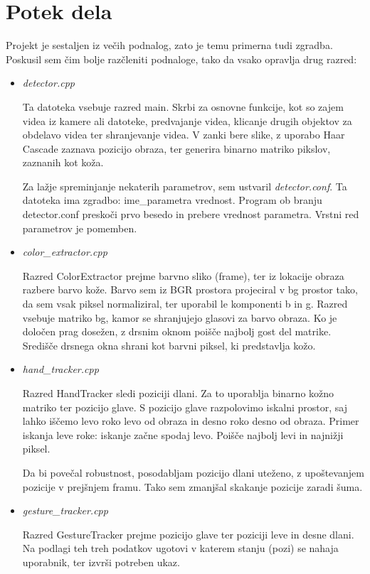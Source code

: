 \documentclass[a4paper, 12pt]{article}
\begin{document}
\section{Potek dela}
Projekt je sestaljen iz večih podnalog, zato je temu primerna tudi zgradba. Poskusil sem čim bolje razčleniti podnaloge, tako da vsako opravlja drug razred:
\begin{itemize}
\item \emph{detector.cpp}

Ta datoteka vsebuje razred main. Skrbi za osnovne funkcije, kot so zajem videa iz kamere ali datoteke, predvajanje videa, klicanje drugih objektov za obdelavo videa ter shranjevanje videa.
V zanki bere slike, z uporabo Haar Cascade zaznava pozicijo obraza, ter generira binarno matriko pikslov, zaznanih kot koža.

Za lažje spreminjanje nekaterih parametrov, sem ustvaril \emph{detector.conf}. Ta datoteka ima zgradbo: ime\_parametra vrednost. Program ob branju detector.conf preskoči prvo besedo in prebere vrednost parametra. Vrstni red parametrov je pomemben.

\item \emph{color\_extractor.cpp}

Razred ColorExtractor prejme barvno sliko (frame), ter iz lokacije obraza razbere barvo kože.	Barvo sem iz BGR prostora projeciral v bg prostor tako, da sem vsak piksel normaliziral, ter uporabil le komponenti b in g. Razred vsebuje matriko bg, kamor se shranjujejo glasovi za barvo obraza. Ko je določen prag dosežen, z drsnim oknom poišče najbolj gost del matrike. Središče drsnega okna shrani kot barvni piksel, ki predstavlja kožo.

\item \emph{hand\_tracker.cpp}

Razred HandTracker sledi poziciji dlani. Za to uporablja binarno kožno matriko ter pozicijo glave. S pozicijo glave razpolovimo iskalni prostor, saj lahko iščemo levo roko levo od obraza in desno roko desno od obraza. Primer iskanja leve roke: iskanje začne spodaj levo. Poišče najbolj levi in najnižji piksel.

Da bi povečal robustnost, posodabljam pozicijo dlani uteženo, z upoštevanjem pozicije v prejšnjem framu. Tako sem zmanjšal skakanje pozicije zaradi šuma.

\item \emph{gesture\_tracker.cpp}

Razred GestureTracker prejme pozicijo glave ter poziciji leve in desne dlani. Na podlagi teh treh podatkov ugotovi v katerem stanju (pozi) se nahaja uporabnik, ter izvrši potreben ukaz.


\end{itemize}
\end{document}
